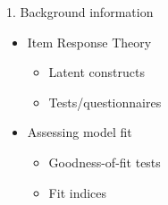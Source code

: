 \documentclass[aspectratio=169]{beamer}
\begin{document}
\begin{frame}{1. Background information}

\begin{itemize}
	\item{Item Response Theory}
		\begin{itemize}
			\item{Latent constructs}
			\item{Tests/questionnaires}
		\end{itemize}
	\item{Assessing model fit}
		\begin{itemize}
			\item{Goodness-of-fit tests}
			\item{Fit indices}
		\end{itemize}
\end{itemize}


\end{frame}
\end{document}
